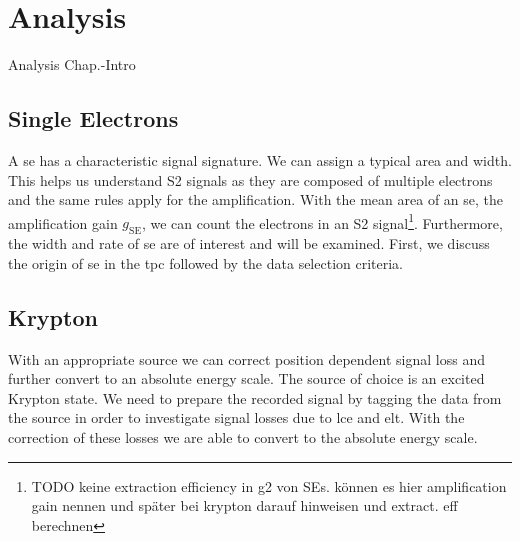 \FloatBarrier
\chapter{Analysis}
\label{chap:Analysis}
\FloatBarrier

Analysis Chap.-Intro

\FloatBarrier
\section{Single Electrons}
\label{sec:SE}
\FloatBarrier

A \gls{se} has a characteristic signal signature.
We can assign a typical area and width.
This helps us understand S2 signals as they are composed of multiple electrons and the same rules apply for the amplification.
With the mean area of an \gls{se}, the amplification gain $ g_\mathrm{SE} $, we can count the electrons in an S2 signal\footnote{TODO keine extraction efficiency in g2 von SEs. können es hier amplification gain nennen und später bei krypton darauf hinweisen und extract. eff berechnen}.
Furthermore, the width and rate of \gls{se} are of interest and will be examined.
First, we discuss the origin of \gls{se} in the \gls{tpc} followed by the data selection criteria.



\newpage

\newpage

\newpage

\newpage

\newpage

\FloatBarrier
\section{Krypton}
\label{sec:Kr}
\FloatBarrier

With an appropriate source we can correct position dependent signal loss and further convert to an absolute energy scale.
The source of choice is an excited Krypton state.
We need to prepare the recorded signal by tagging the data from the source in order to investigate signal losses due to \gls{lce} and \gls{elt}.
With the correction of these losses we are able to convert to the absolute energy scale.



\newpage

\newpage

\newpage

\newpage

\newpage

\newpage

\newpage

\newpage
\FloatBarrier
